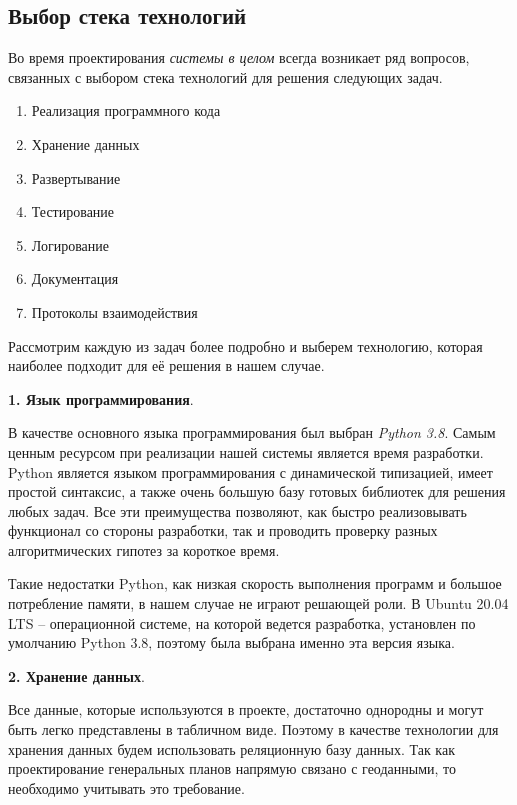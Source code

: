 \subsection*{\large{Выбор стека технологий}}
Во время проектирования \textit{системы в целом} всегда возникает ряд вопросов,
связанных с выбором стека технологий для решения следующих задач.

\begin{enumerate}
    \item Реализация программного кода
    \item Хранение данных
    \item Развертывание
    \item Тестирование
    \item Логирование
    \item Документация
    \item Протоколы взаимодействия
\end{enumerate}

Рассмотрим каждую из задач более подробно и выберем технологию, которая наиболее подходит для её решения в нашем случае.

\noindent \textbf{1. Язык программирования}.

В качестве основного языка программирования был выбран \textit{Python 3.8}.
Самым ценным ресурсом при реализации нашей системы является время разработки. Python является языком программирования
с динамической типизацией, имеет простой синтаксис,
а также очень большую базу готовых библиотек для решения любых задач.
Все эти преимущества позволяют, как быстро реализовывать функционал со стороны разработки, так и проводить проверку
разных алгоритмических гипотез за короткое время.

Такие недостатки Python, как низкая скорость выполнения программ и большое потребление памяти, в нашем случае
не играют решающей роли.
В Ubuntu 20.04 LTS -- операционной системе, на которой ведется разработка, установлен по умолчанию Python 3.8, поэтому
была выбрана именно эта версия языка.

\noindent \textbf{2. Хранение данных}.

Все данные, которые используются в проекте, достаточно однородны и могут быть легко представлены в табличном виде.
Поэтому в качестве технологии для хранения данных будем использовать реляционную базу данных.
Так как проектирование генеральных планов напрямую связано с геоданными, то необходимо учитывать это требование.

